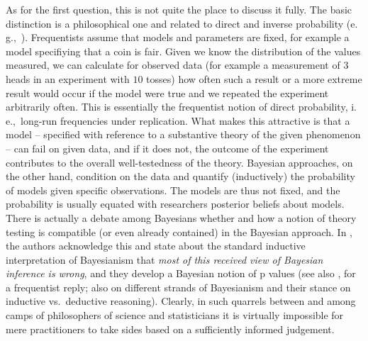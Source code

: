 \documentclass[USenglish]{article}
\newcommand{\eg}{e.\,g.,}
\newcommand{\ie}{i.\,e.,}
\begin{document}
As for the first question, this is not quite the place to discuss it fully.
The basic distinction is a philosophical one and related to direct and inverse probability (\eg\ \citealp{Senn2011}).
Frequentists assume that models and parameters are fixed, for example a model specifiying that a coin is fair.
Given we know the distribution of the values measured, we can calculate for observed data (for example a measurement of $3$ heads in an experiment with $10$ tosses) how often such a result or a more extreme result would occur if the model were true and we repeated the experiment arbitrarily often.
This is essentially the frequentist notion of direct probability, \ie\ long-run frequencies under replication.
What makes this attractive is that a model -- specified with reference to a substantive theory of the given phenomenon -- can fail on given data, and if it does not, the outcome of the experiment contributes to the overall well-testedness of the theory.
Bayesian approaches, on the other hand, condition on the data and quantify (inductively) the probability of models given specific observations.
The models are thus not fixed, and the probability is usually equated with researchers posterior beliefs about models.
There is actually a debate among Bayesians whether and how a notion of theory testing is compatible (or even already contained) in the Bayesian approach.
In \citet[10]{GelmanShalizi2013}, the authors acknowledge this and state about the standard inductive interpretation of Bayesianism that \textit{most of this received view of Bayesian inference is wrong}, and they develop a Bayesian notion of p values (see also \citealp{Mayo2013}, for a frequentist reply; also \citealp{Senn2011} on different strands of Bayesianism and their stance on inductive vs.\ deductive reasoning).
Clearly, in such quarrels between and among camps of philosophers of science and statisticians it is virtually impossible for mere practitioners to take sides based on a sufficiently informed judgement.
\end{document}
